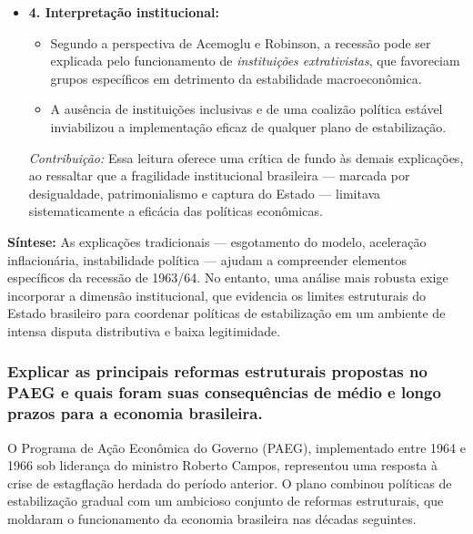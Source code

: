 \documentclass[a4paper,12pt]{article}[abntex2]
\begin{document}
\begin{itemize}
    \item \textbf{4. Interpretação institucional:}
    \begin{itemize}
        \item Segundo a perspectiva de Acemoglu e Robinson, a recessão pode ser explicada pelo funcionamento de \textit{instituições extrativistas}, que favoreciam grupos específicos em detrimento da estabilidade macroeconômica.
        \item A ausência de instituições inclusivas e de uma coalizão política estável inviabilizou a implementação eficaz de qualquer plano de estabilização.
    \end{itemize}
    \textit{Contribuição:} Essa leitura oferece uma crítica de fundo às demais explicações, ao ressaltar que a fragilidade institucional brasileira — marcada por desigualdade, patrimonialismo e captura do Estado — limitava sistematicamente a eficácia das políticas econômicas.
\end{itemize}

\textbf{Síntese:} As explicações tradicionais — esgotamento do modelo, aceleração inflacionária, instabilidade política — ajudam a compreender elementos específicos da recessão de 1963/64. No entanto, uma análise mais robusta exige incorporar a dimensão institucional, que evidencia os limites estruturais do Estado brasileiro para coordenar políticas de estabilização em um ambiente de intensa disputa distributiva e baixa legitimidade.

\subsubsection{\textbf{Explicar as principais reformas estruturais propostas no PAEG e quais foram suas consequências de médio e longo prazos para a economia brasileira.}}

O Programa de Ação Econômica do Governo (PAEG), implementado entre 1964 e 1966 sob liderança do ministro Roberto Campos, representou uma resposta à crise de estagflação herdada do período anterior. O plano combinou políticas de estabilização gradual com um ambicioso conjunto de reformas estruturais, que moldaram o funcionamento da economia brasileira nas décadas seguintes.
\end{document}
